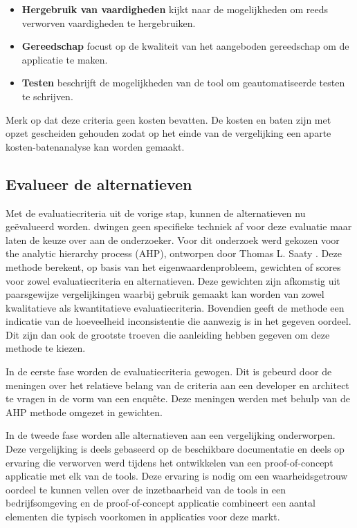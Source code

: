 \documentclass[a4paper]{IEEEconf}
\begin{document}
\begin{itemize}
    \begin{itemize}
        \item \textbf{Hergebruik van vaardigheden} kijkt naar de mogelijkheden om reeds verworven vaardigheden te hergebruiken.
        \item \textbf{Gereedschap} focust op de kwaliteit van het aangeboden gereedschap om de applicatie te maken.
        \item \textbf{Testen} beschrijft de mogelijkheden van de tool om geautomatiseerde testen te schrijven. 
    \end{itemize}
\end{itemize}

Merk op dat deze criteria geen kosten bevatten. De kosten en baten zijn met opzet gescheiden gehouden zodat op het einde van de vergelijking een aparte kosten-batenanalyse kan worden gemaakt.

\subsection{Evalueer de alternatieven}

Met de evaluatiecriteria uit de vorige stap, kunnen de alternatieven nu ge\"evalueerd worden. \citet{Jadhav:2011} dwingen geen specifieke techniek af voor deze evaluatie maar laten de keuze over aan de onderzoeker. Voor dit onderzoek werd gekozen voor the analytic hierarchy process (AHP), ontworpen door Thomas L. Saaty \cite{Saaty:1980, Saaty:1990}. Deze methode berekent, op basis van het eigenwaardenprobleem, gewichten of scores voor zowel evaluatiecriteria en alternatieven. Deze gewichten zijn afkomstig uit paarsgewijze vergelijkingen waarbij gebruik gemaakt kan worden van zowel kwalitatieve als kwantitatieve evaluatiecriteria. Bovendien geeft de methode een indicatie van de hoeveelheid inconsistentie die aanwezig is in het gegeven oordeel. Dit zijn dan ook de grootste troeven die aanleiding hebben gegeven om deze methode te kiezen. 

In de eerste fase worden de evaluatiecriteria gewogen. Dit is gebeurd door de meningen over het relatieve belang van de criteria aan een developer en architect te vragen in de vorm van een enqu\^ete. Deze meningen werden met behulp van de AHP methode omgezet in gewichten.

In de tweede fase worden alle alternatieven aan een vergelijking onderworpen. Deze vergelijking is deels gebaseerd op de beschikbare documentatie en deels op ervaring die verworven werd tijdens het ontwikkelen van een proof-of-concept applicatie met elk van de tools. Deze ervaring is nodig om een waarheidsgetrouw oordeel te kunnen vellen over de inzetbaarheid van de tools in een bedrijfsomgeving en de proof-of-concept applicatie combineert een aantal elementen die typisch voorkomen in applicaties voor deze markt. 
\end{document}
